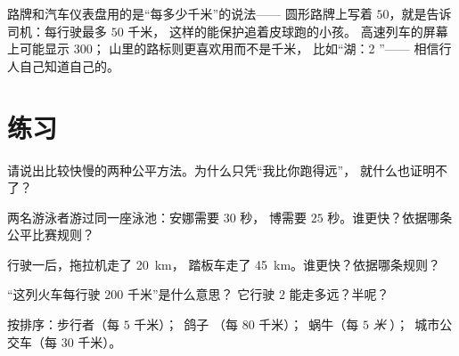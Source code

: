 \begin{example}[认识身边的速度]\label{ex:g5:speed-distance-time:signs}
路牌和汽车仪表盘用的是“每多少千米”的说法——
圆形路牌上写着 $50$，就是告诉司机：每行驶最多 $50$ 千米，
这样的能保护追着皮球跑的小孩。
高速列车的屏幕上可能显示 $300$；
山里的路标则更喜欢用而不是千米，
比如“湖：2 ”——
相信行人自己知道自己的。
\end{example}

\section{练习}

\begin{exercise}[$\star$]\label{exo:g5:speed-distance-time:1}
请说出比较快慢的两种公平方法。为什么只凭“我比你跑得远”，
就什么也证明不了？
\end{exercise}

\begin{exercise}[$\star$]\label{exo:g5:speed-distance-time:2}
两名游泳者游过同一座泳池：安娜需要 $30$ 秒，
博需要 $25$ 秒。谁更快？依据哪条公平比赛规则？
\end{exercise}

\begin{exercise}[$\star$]\label{exo:g5:speed-distance-time:3}
行驶一后，拖拉机走了 \qty{20}{km}，
踏板车走了 \qty{45}{km}。谁更快？依据哪条规则？
\end{exercise}

\begin{exercise}[$\star$]\label{exo:g5:speed-distance-time:4}
“这列火车每行驶 $200$ 千米”是什么意思？
它行驶 $2$ 能走多远？半呢？
\end{exercise}

\begin{exercise}[$\star$]\label{exo:g5:speed-distance-time:5}
按排序：步行者（每 $5$ 千米）；\ 鸽子
（每 $80$ 千米）；\ 蜗牛（每 $5$ \emph{米}
）；\ 城市公交车（每 $30$ 千米）。
\end{exercise}

